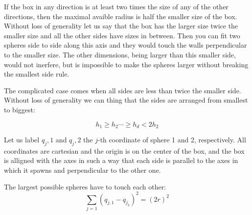 \documentclass[superscriptaddress,pre,reprint,showpacs,onecolumn]{revtex4-1}
\begin{document}
If the box in any direction is at least two times the size of any of
the other directions, then the maximal avaible radius is half the smaller
size of the box. Without loss of generality let us say that the box has
the larger size twice the smaller size and all the other sides have
sizes in between. Then you can fit two spheres side to side along this
axis and they would touch the walls perpendicular to the smaller size.
The other dimensions, being larger than this smaller side, would not
inerfere, but is impossible to make the spheres larger without
breaking the smallest side rule.

The complicated case comes when all sides are less than twice
the smaller side. Without loss of generality we can thing that the sides
are arranged from smallest to biggest:

\begin{equation}\label{ordens}
  h_1 \geq h_2 \cdots \geq h_d < 2 h_2
\end{equation}

Let us label $q_j,1$ and $q_j,2$ the $j$-th coordinate of sphere 1 and 2,
respectively. All coordinates are cartesian and the origin is on the
center of the box, and the box is alligned with the axes in such a way
that each side is parallel to the axes in which it spawns and perpendicular
to the other one. 

The largest possible spheres have to touch each other:
\begin{equation}\label{touchin}
  \sum_{j=1}(q_{j,1}-q_{j_2})^2=(2 r)^2
\end{equation}
\end{document}
